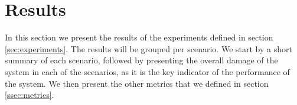 \section{Results}
\label{sec:results}
In this section we present the results of the experiments defined in section \ref{sec:experiments}. The results will be grouped per scenario. We start by a short summary of each scenario, followed by presenting the overall damage of the system in each of the scenarios, as it is the key indicator of the performance of the system. We then present the other metrics that we defined in section \ref{ssec:metrics}.





